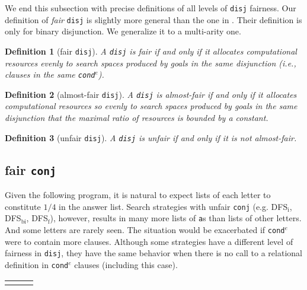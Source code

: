 \documentclass[format=acmlarge, review=true, authordraft=true]{acmart}
\newcommand{\conde}{\texttt{cond$^e$}}
\newcommand{\conj}{\texttt{conj}}
\newcommand{\disj}{\texttt{disj}}
\newcommand{\DFSi }[0]{DFS$_\textrm{i}$}
\newcommand{\DFSf }[0]{DFS$_\textrm{f}$}
\newcommand{\DFSbi}[0]{DFS$_\textrm{bi}$}
\newtheorem{defn}{Definition}[section]
\begin{document}
We end this subsection with precise definitions of all levels of 
\disj{} fairness. Our definition of \emph{fair} \disj{} is slightly 
more general
than the one in \citet{seres1999algebra}. Their definition is only
for binary disjunction. We generalize it to a multi-arity one.

\begin{defn}[fair \disj{}]
A \disj{} is fair if and only if it allocates computational resources evenly to 
search spaces produced by goals in the same disjunction 
(i.e., clauses in the same \conde).
\end{defn}

\begin{defn}[almost-fair \disj{}]
A \disj{} is almost-fair if and only if it allocates computational resources
so evenly to search spaces produced by goals in the same disjunction that 
the maximal ratio of resources is bounded by a constant.
\end{defn}

\begin{defn}[unfair \disj{}]
A \disj{} is unfair if and only if it is not almost-fair.
\end{defn}

\subsection{fair \texttt{conj}}
\label{sec:fairconj}


Given the following program, it is natural to expect lists of each letter to
constitute $1/4$ in the answer list. Search strategies with unfair \conj{} 
(e.g. 
\DFSi, \DFSbi, \DFSf), however, results in many more lists of \texttt{a}s than 
lists of other letters. And some letters are rarely seen. The situation would 
be exacerbated if \conde{} were to contain more clauses.
Although some strategies have a different level of fairness in \disj{}, they 
have the same behavior when there is no call to a relational definition in 
\conde{} clauses (including this case).

\begin{center}
\begin{tabular}{l|c|r}
     &
     &
     \\
\end{tabular}
\end{center}
\end{document}
